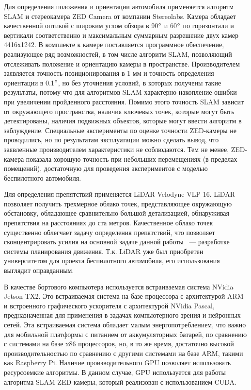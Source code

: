Для определения положения и ориентации автомобиля применяется алгоритм SLAM и стереокамера ZED Camera
\cite{jetson_car_zed} от компании Stereolabs. Камера обладает качественной оптикой с широким углом обзора в
90$^{\circ}$ и 60$^{\circ}$ по горизонтали и вертикали соответственно и максимальным суммарным разрешение двух
камер 4416х1242. В комплекте к камере поставляется программное обеспечение, реализующее ряд возможностей,
в том числе алгоритм SLAM, позволяющий отслеживать положение и ориентацию камеры в пространстве.
Производителем заявляется точность позиционирования в 1 мм и точность определения ориентации в 0.1$^{\circ}$,
но без уточнения условий, в которых получены такие результаты, потому что для алгоритмов SLAM характерно
накопление ошибки при увеличении пройденного расстояния. Помимо этого точность SLAM зависит от окружающего
пространства, наличия ключевых точек, которые могут быть детектированы, наличия подвижных объектов, которые
могут ввести алгоритм в заблуждение. Специальные эксперименты по оценке точности ZED-камеры не проводились, но
по результатам эксплуатации можно сделать вывод, что заявленные производителем характеристики не соблюдаются. Тем не
менее, ZED-камера показала хорошую точность при небольших перемещениях (в пределах помещений), достаточную для
проведения экспериментов с моделью беспилотного автомобиля.

Для определения препятствий применяется LiDAR Velodyne VLP-16. LiDAR позволяет получить
трехмерное облако точек, представляющее окружающую обстановку, обладающее сравнительно большой детализацией, обнаруживая
препятствия на расстояниях до ста метров. Качественное облако точек существенно облегчает задачу определения препятствий,
что позволяет сконцентрировать усилия на основной задаче данной работы ~--- разработке системы планирования движения.
Т.к. LiDAR уже был приобретен университетом для проекта беспилотного автомобиля, его использования выглядит оправданным.

В качестве бортового компьютера используется встраиваемая система NVidia Jetson TX2. Это встраиваемая система на базе
процессора с архитектурой ARM и встроенного графического ускорителя с архитектурой NVidia Pascal, предназначенная для
применения в задачах компьютерного зрения и нейронных сетей. Эта встраиваемая система обладает малым энергопотреблением,
что важно для мобильной платформы с питанием от аккумуляторных батарей, по сравнению с системами на базе x86 процессоров,
но, в то же время, достаточно высокой производительностью по сравнению с другими системами на базе ARM, такими как
Raspberry Pi. Наличие производительного GPU позволяет использовать ресурсоемкие алгоритмы. В данном случае, GPU используется
для работы алгоритма SLAM ZED-камеры, который реализован с использованием CUDA.

